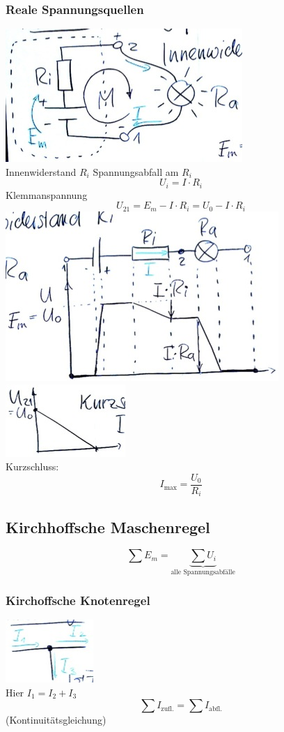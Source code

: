 \subsubsection{Reale Spannungsquellen}
\includegraphics{Bild188} \\
Innenwiderstand $R_i$
Spannungsabfall am $R_i$
\[ U_i = I \cdot R_i \]
Klemmanspannung
\[ U_{21} = E_m - I \cdot R_i = U_0 - I \cdot R_i \]
\includegraphics{Bild189} \\
\includegraphics{Bild190} \\
Kurzschluss:
\[ I_{\text{max}} = \frac{U_0}{R_i} \]

\subsection{Kirchhoffsche Maschenregel}
\[ \boxed{ \sum E_m = \underbrace{\sum U_i}_{\text{alle Spannungsabfälle}} } \]

\subsubsection{Kirchoffsche Knotenregel}
\includegraphics{Bild191} \\
Hier $I_1 = I_2 + I_3$
\[ \boxed{ \sum I_{\text{zufl.}} = \sum I_{\text{abfl.}} } \]
(Kontinuitätsgleichung)

